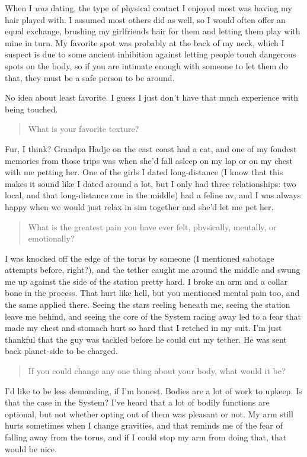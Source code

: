\noindent When I \emph{was} dating, the type of physical contact I enjoyed most was having my hair played with. I assumed most others did as well, so I would often offer an equal exchange, brushing my girlfriends hair for them and letting them play with mine in turn. My favorite spot was probably at the back of my neck, which I suspect is due to some ancient inhibition against letting people touch dangerous spots on the body, so if you are intimate enough with someone to let them do that, they must be a safe person to be around.

No idea about least favorite. I guess I just don't have that much experience with being touched.

\begin{quote}
What is your favorite texture?
\end{quote}

\noindent Fur, I think? Grandpa Hadje on the east coast had a cat, and one of my fondest memories from those trips was when she'd fall asleep on my lap or on my chest with me petting her. One of the girls I dated long-distance (I know that this makes it sound like I dated around a lot, but I only had three relationships: two local, and that long-distance one in the middle) had a feline av, and I was always happy when we would just relax in sim together and she'd let me pet her.

\begin{quote}
What is the greatest pain you have ever felt, physically, mentally, or emotionally?
\end{quote}

\noindent I was knocked off the edge of the torus by someone (I mentioned sabotage attempts before, right?), and the tether caught me around the middle and swung me up against the side of the station pretty hard. I broke an arm and a collar bone in the process. That hurt like hell, but you mentioned mental pain too, and the same applied there. Seeing the stars reeling beneath me, seeing the station leave me behind, and seeing the core of the System racing away led to a fear that made my chest and stomach hurt so hard that I retched in my suit. I'm just thankful that the guy was tackled before he could cut my tether. He was sent back planet-side to be charged.

\begin{quote}
If you could change any one thing about your body, what would it be?
\end{quote}

\noindent I'd like to be less demanding, if I'm honest. Bodies are a lot of work to upkeep. Is that the case in the System? I've heard that a lot of bodily functions are optional, but not whether opting out of them was pleasant or not. My arm still hurts sometimes when I change gravities, and that reminds me of the fear of falling away from the torus, and if I could stop my arm from doing that, that would be nice.


